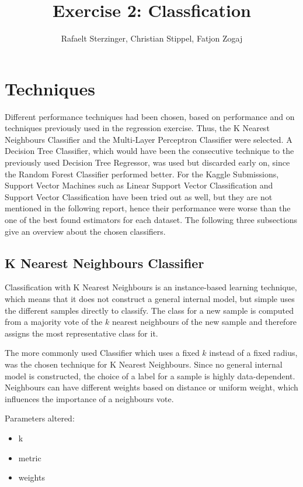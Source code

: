 \documentclass{article}
\title{Exercise 2: Classfication}
\author{Rafaelt Sterzinger, Christian Stippel, Fatjon Zogaj}
\begin{document}
\maketitle

\section{Techniques}
Different performance techniques had been chosen, based on performance and on techniques previously used in the regression exercise. Thus, the K Nearest Neighbours Classifier and the Multi-Layer Perceptron Classifier were selected. A Decision Tree Classifier, which would have been the consecutive technique to the previously used Decision Tree Regressor, was used but discarded early on, since the Random Forest Classifier performed better. For the Kaggle Submissions, Support Vector Machines such as Linear Support Vector Classification and Support Vector Classification have been tried out as well, but they are not mentioned in the following report, hence their performance were worse than the one of the best found estimators for each dataset. The following three subsections give an overview about the chosen classifiers.

\subsection{K Nearest Neighbours Classifier}
Classification with K Nearest Neighbours is an instance-based learning technique, which means that it does not construct a general internal model, but simple uses the different samples directly to classify. The class for a new sample is computed from a majority vote of the $k$ nearest neighbours of the new sample and therefore assigns the most representative class for it.

The more commonly used Classifier which uses a fixed $k$ instead of a fixed radius, was the chosen technique for K Nearest Neighbours. Since no general internal model is constructed, the choice of a label for a sample is highly data-dependent. Neighbours can have different weights based on distance or uniform weight, which influences the importance of a neighbours vote. 

Parameters altered:
\begin{itemize}
\item k
\item metric
\item weights
\end{itemize}
\end{document}
